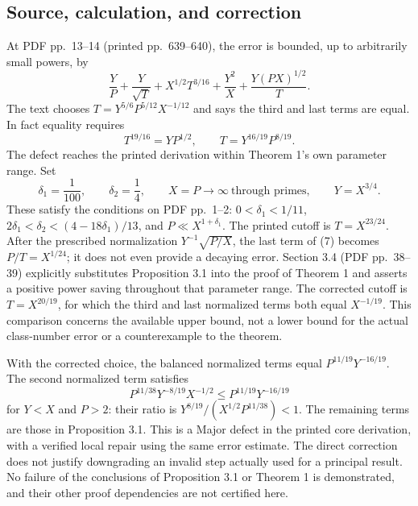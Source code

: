 \documentclass[10pt]{article}
\begin{document}
\subsection*{Source, calculation, and correction}
At PDF pp. 13–14 (printed pp. 639–640), the error is bounded, up to arbitrarily small powers, by \[\frac{Y}{P}+\frac{Y}{\sqrt T}
       +X^{1/2}T^{3/16}+\frac{Y^2}{X}
       +\frac{Y(PX)^{1/2}}{T}.\] The text chooses \(T=Y^{5/6}P^{5/12}X^{-1/12}\) and says the third and last terms are equal. In fact equality requires \[T^{19/16}=YP^{1/2},\qquad \boxed{T=Y^{16/19}P^{8/19}.}\] The defect reaches the printed derivation within Theorem 1’s own parameter range. Set \[\delta_1=\frac1{100},\qquad \delta_2=\frac14,\qquad
 X=P\to\infty\ \text{through primes},\qquad Y=X^{3/4}.\] These satisfy the conditions on PDF pp. 1–2: \(0<\delta_1<1/11\), \(2\delta_1<\delta_2<(4-18\delta_1)/13\), and \(P\ll X^{1+\delta_1}\). The printed cutoff is \(T=X^{23/24}\). After the prescribed normalization \(Y^{-1}\sqrt{P/X}\), the last term of (7) becomes \(P/T=X^{1/24}\); it does not even provide a decaying error. Section 3.4 (PDF pp. 38–39) explicitly substitutes Proposition 3.1 into the proof of Theorem 1 and asserts a positive power saving throughout that parameter range. The corrected cutoff is \(T=X^{20/19}\), for which the third and last normalized terms both equal \(X^{-1/19}\). This comparison concerns the available upper bound, not a lower bound for the actual class-number error or a counterexample to the theorem.\par
With the corrected choice, the balanced normalized terms equal \(P^{11/19}Y^{-16/19}\). The second normalized term satisfies \[P^{11/38}Y^{-8/19}X^{-1/2}\le P^{11/19}Y^{-16/19}\] for \(Y<X\) and \(P>2\): their ratio is \(Y^{8/19}/(X^{1/2}P^{11/38})<1\). The remaining terms are those in Proposition 3.1. This is a Major defect in the printed core derivation, with a verified local repair using the same error estimate. The direct correction does not justify downgrading an invalid step actually used for a principal result. No failure of the conclusions of Proposition 3.1 or Theorem 1 is demonstrated, and their other proof dependencies are not certified here.\par
\end{document}
